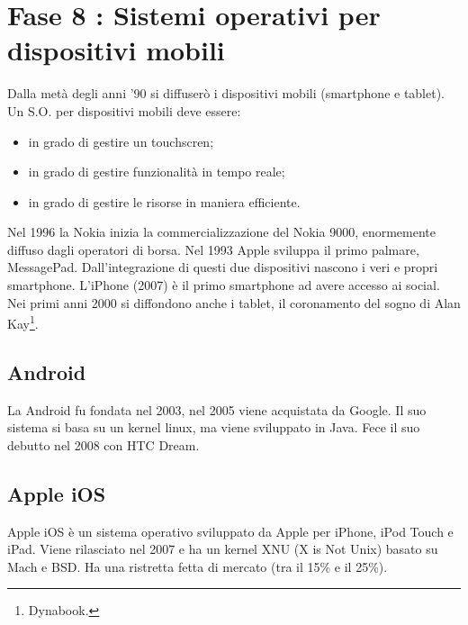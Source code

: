 \section{Fase 8 : Sistemi operativi per dispositivi mobili}

Dalla metà degli anni '90 si diffuserò i dispositivi mobili (smartphone e tablet).
Un S.O. per dispositivi mobili deve essere:
\begin{itemize}
    \item in grado di gestire un touchscren;
    \item in grado di gestire funzionalità in tempo reale;
    \item in grado di gestire le risorse in maniera efficiente.
\end{itemize}

Nel 1996 la Nokia inizia la commercializzazione del Nokia 9000,
enormemente diffuso dagli operatori di borsa. Nel 1993 Apple sviluppa
il primo palmare, MessagePad. Dall'integrazione di questi due dispositivi
nascono i veri e propri smartphone. L'iPhone (2007) è il primo smartphone
ad avere accesso ai social. Nei primi anni 2000 si diffondono anche i tablet,
il coronamento del sogno di Alan Kay\footnote{Dynabook.}.


\subsection{Android}

La Android fu fondata nel 2003, nel 2005 viene acquistata da Google.
Il suo sistema si basa su un kernel linux, ma viene sviluppato in Java.
Fece il suo debutto nel 2008 con HTC Dream.

\subsection{Apple iOS}

Apple iOS è un sistema operativo sviluppato da Apple per iPhone, iPod Touch e iPad.
Viene rilasciato nel 2007 e ha un kernel XNU (X is Not Unix) basato su Mach e BSD. Ha una
ristretta fetta di mercato (tra il 15\% e il 25\%).

